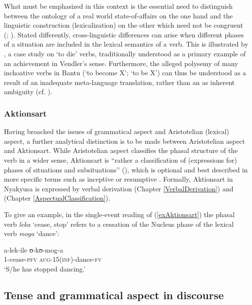What must be emphasized in this context is the essential need to distinguish between the ontology of a real world state-of-affairs on the one hand and the linguistic construction (lexicalization) on the other which need not be congruent (\citealt[77–100]{BotneR1981}; \citealt{BickelB1997}). Stated differently, cross-linguistic differences can arise when different phases of a situation are included in the lexical semantics of a verb. This is illustrated by \citet{BotneR2003b}, a case study on \lq to die' verbs, traditionally understood as a primary example of an achievement in Vendler's sense. Furthermore, the alleged polysemy of many inchoative verbs in Bantu (\lq to become X'; \lq to be X') can thus be understood as a result of an inadequate meta-language translation, rather than an as inherent ambiguity (cf. \citealt[269, FN 249]{SeidelF2008}).
\subsubsection{Aktionsart}\label{Aktionsart}
Having broached the issues of grammatical aspect and Aristotelian (lexical) aspect, a further analytical distinction is to be made between Aristotelian aspect and Aktionsart. While Aristotelian aspect classifies the phasal structure of the verb in a wider sense, Aktionsart is ``rather a classification of (expressions for) phases of situations and subsituations'' (\citealt[170]{BinnickR1991}), which is optional and best described in more specific terms such as inceptive or resumptive \citep[ibid]{BinnickR1991}. Formally, Aktionsart in Nyakyusa is expressed by verbal derivation (Chapter \ref{VerbalDerivation}) and  (Chapter \ref{AspectualClassification}).

To give an example, in the single-event reading of (\ref{exAktionsart}) the phasal verb \textit{leka} \lq cease, stop' refers to a cessation of the Nucleus phase of the lexical verb \textit{moga} \lq dance':

\begin{exe}
	\ex\label{exAktionsart}
	 \gll a-lek-ile ʊ-kʊ-mog-a\\
	1-cease-\textsc{pfv} \textsc{aug}-15(\textsc{inf})-dance-\textsc{fv}\\
	\glt \lq S/he has stopped dancing.'
\end{exe}
\subsection{Tense and grammatical aspect in discourse}\label{TenseAspectDiscourse}
